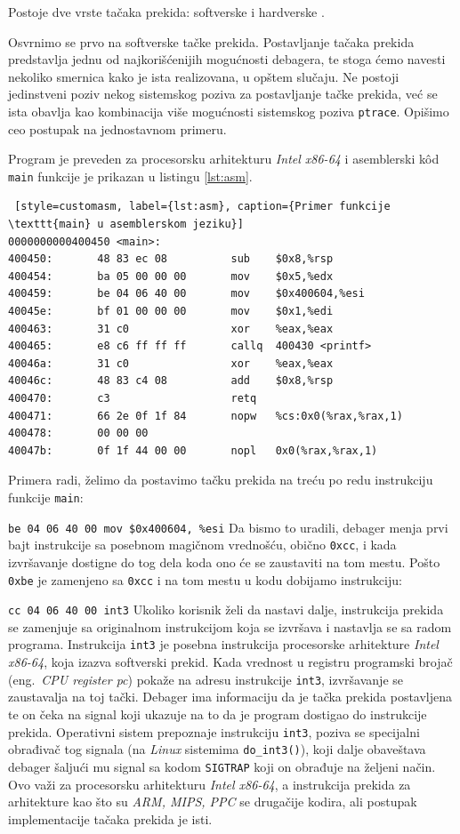 \documentclass[12pt,oneside]{memoir}
\begin{document}
Postoje dve vrste tačaka prekida: softverske i hardverske \cite{GDB}.

Osvrnimo se prvo na softverske tačke prekida. Postavljanje tačaka prekida predstavlja jednu od najkorišćenijih mogućnosti debagera, te stoga ćemo navesti nekoliko smernica kako je ista realizovana, u opštem slučaju. Ne postoji jedinstveni poziv nekog sistemskog poziva za postavljanje tačke prekida, već se ista obavlja kao kombinacija više mogućnosti  sistemskog poziva \texttt{ptrace}. Opišimo ceo postupak na jednostavnom primeru.

Program je preveden za procesorsku arhitekturu \emph{Intel x86-64} i asemblerski k\^{o}d \texttt{main} funkcije je prikazan u listingu \ref{lst:asm}.\newpage
\begin{lstlisting} [style=customasm, label={lst:asm}, caption={Primer funkcije \texttt{main} u asemblerskom jeziku}]
0000000000400450 <main>:
400450:       48 83 ec 08          sub    $0x8,%rsp
400454:       ba 05 00 00 00       mov    $0x5,%edx
400459:       be 04 06 40 00       mov    $0x400604,%esi
40045e:       bf 01 00 00 00       mov    $0x1,%edi
400463:       31 c0                xor    %eax,%eax
400465:       e8 c6 ff ff ff       callq  400430 <printf>
40046a:       31 c0                xor    %eax,%eax
40046c:       48 83 c4 08          add    $0x8,%rsp
400470:       c3                   retq   
400471:       66 2e 0f 1f 84       nopw   %cs:0x0(%rax,%rax,1)
400478:       00 00 00 
40047b:       0f 1f 44 00 00       nopl   0x0(%rax,%rax,1)

\end{lstlisting}


Primera radi, želimo da postavimo tačku prekida na treću po redu instrukciju funkcije \texttt{main}:

\texttt{be 04 06 40 00  mov \$0x400604, \%esi}\newline
Da bismo to uradili, debager menja prvi bajt instrukcije sa posebnom magičnom vrednošću, obično \texttt{0xcc}, i kada izvršavanje dostigne do tog dela koda ono će se zaustaviti na tom mestu.
Pošto \texttt{0xbe} je zamenjeno sa \texttt{0xcc} i na tom mestu u kodu dobijamo instrukciju:

\texttt{cc 04 06 40 00  int3}\newline
Ukoliko korisnik želi da nastavi dalje, instrukcija prekida se zamenjuje sa originalnom instrukcijom koja se izvršava i nastavlja se sa radom programa.
Instrukcija \texttt{int3} je posebna instrukcija procesorske arhitekture \emph{Intel x86-64}, koja izazva softverski prekid. Kada vrednost u registru programski brojač (eng.~\emph{CPU register pc}) pokaže na adresu instrukcije \texttt{int3}, izvršavanje se zaustavalja na toj tački. Debager ima informaciju da je tačka prekida postavljena te on čeka na signal koji ukazuje na to da je program dostigao do instrukcije prekida. Operativni sistem prepoznaje instrukciju \texttt{int3}, poziva se specijalni obrađivač tog signala (na \emph{Linux} sistemima \texttt{do\_int3()}), koji dalje obaveštava debager šaljući mu signal sa kodom \texttt{SIGTRAP} koji on obrađuje na željeni način. Ovo važi za procesorsku arhitekturu \emph{Intel x86-64}, a instrukcija prekida za arhitekture kao što su \emph{ARM, MIPS, PPC} se drugačije kodira, ali postupak implementacije tačaka prekida je isti.
\end{document}
